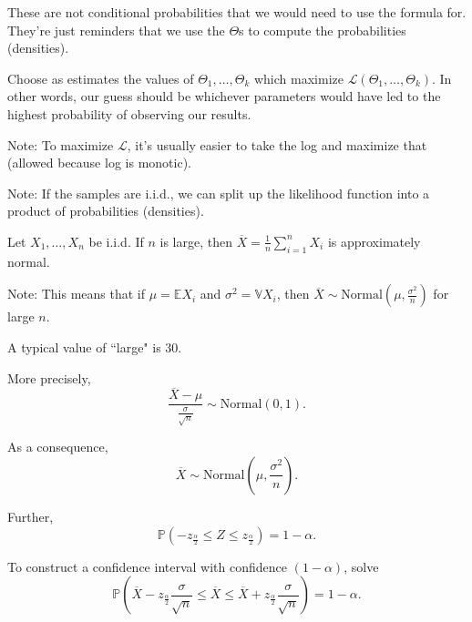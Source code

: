 \documentclass{article}
\begin{document}
    These are not conditional probabilities that we would need to use the formula for. They're just reminders that we use the $\Theta$s to compute the probabilities (densities).

\medskip
{}

    Choose as estimates the values of $\Theta_1, \hdots, \Theta_k$ which maximize $\mathcal L(\Theta_1, \hdots, \Theta_k)$. In other words, our guess should be whichever parameters would have led to the highest probability of observing our results.

    Note: To maximize $\mathcal L$, it's usually easier to take the log and maximize that (allowed because log is monotic).

    Note: If the samples are i.i.d., we can split up the likelihood function into a product of probabilities (densities).

\medskip
{}

    Let $X_1, \hdots, X_n$ be i.i.d. If $n$ is large, then $\overline X = \frac1n\sum\limits_{i=1}^nX_i$ is approximately normal.

    Note: This means that if $\mu = \mathbb EX_i$ and $\sigma^2 = \mathbb VX_i$, then $\overline X \sim \text{Normal}(\mu, \frac{\sigma^2}n)$ for large $n$.

    A typical value of ``large" is 30.

    More precisely, \[\frac{\overline X - \mu}{\frac{\sigma}{\sqrt n}} \sim \text{Normal}(0,1).\]

    As a consequence, \[\overline X \sim \text{Normal}(\mu, \frac{\sigma^2}{n}).\]

    Further, \[\mathbb P(-z_{\frac\alpha2} \leq Z \leq z_{\frac\alpha2}) = 1 - \alpha.\]

    To construct a confidence interval with confidence $(1-\alpha)$, solve
    \[\mathbb P\left(\overline X - z_{\frac\alpha2}\frac\sigma{\sqrt n} \leq \overline X \leq \overline X + z_{\frac\alpha2}\frac\sigma{\sqrt n}\right) = 1 - \alpha.\]
\end{document}
